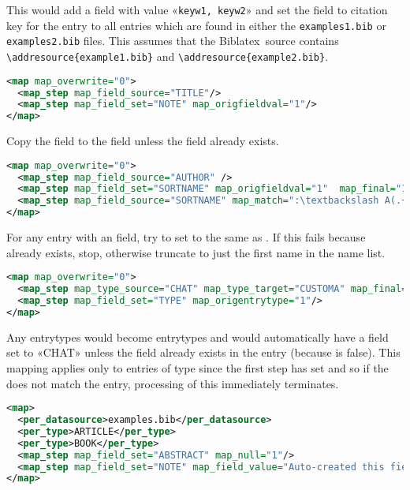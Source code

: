 \documentclass{ltxdockit}
\newcommand*{\biblatex}{Biblatex\xspace}
\begin{document}
\noindent This would add a  field with value «\verb+keyw1, keyw2+»
and set the  field to citation key for the entry
to all entries which are found in either the
\verb+examples1.bib+ or \verb+examples2.bib+ files. This assumes that the
\biblatex\ source contains \verb+\addresource{example1.bib}+ and
\verb+\addresource{example2.bib}+.

\begin{lstlisting}[language=xml,escapechar=+,mathescape=true]
<map map_overwrite="0">
  <map_step map_field_source="TITLE"/>
  <map_step map_field_set="NOTE" map_origfieldval="1"/>
</map>
\end{lstlisting}

\noindent Copy the  field to the  field unless the
 field already exists.

\begin{lstlisting}[language=xml,escapechar=:,mathescape=true]
<map map_overwrite="0">
  <map_step map_field_source="AUTHOR" />
  <map_step map_field_set="SORTNAME" map_origfieldval="1"  map_final="1"/>
  <map_step map_field_source="SORTNAME" map_match=":\textbackslash A(.+?)\textbackslash s+and.\ast" map\_replace="\$1:"/>
</map>
\end{lstlisting}

\noindent For any entry with an  field, try to set
 to the same as . If this fails because
 already exists, stop, otherwise truncate
 to just the first name in the name list.

\begin{lstlisting}[language=xml,escapechar=+,mathescape=true]
<map map_overwrite="0">
  <map_step map_type_source="CHAT" map_type_target="CUSTOMA" map_final="1"/>
  <map_step map_field_set="TYPE" map_origentrytype="1"/>
</map>
\end{lstlisting}

\noindent Any  entrytypes would become  entrytypes and 
would automatically have a  field set to 
«CHAT» unless the  field already exists in the entry (because
 is false). This mapping applies only to entries of type
 since the first step has  set and so if the
 does not match the entry, processing of this
 immediately terminates.

\begin{lstlisting}[language=xml,escapechar=+,mathescape=true]
<map>
  <per_datasource>examples.bib</per_datasource>
  <per_type>ARTICLE</per_type>
  <per_type>BOOK</per_type>
  <map_step map_field_set="ABSTRACT" map_null="1"/>
  <map_step map_field_set="NOTE" map_field_value="Auto-created this field"/>
</map>
\end{lstlisting}
\end{document}
